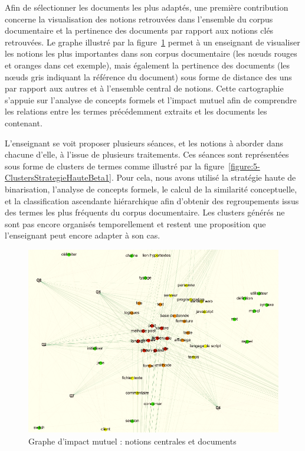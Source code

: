 \bigskip

Afin de sélectionner les documents les plus adaptés, une première contribution concerne la visualisation des notions retrouvées dans l'ensemble du corpus documentaire et la pertinence des documents par rapport aux notions clés retrouvées.
Le graphe illustré par la figure~\ref{figure:5-GrapheCoreZoom} permet à un enseignant de visualiser les notions les plus importantes dans son corpus documentaire (les n\oe{}uds rouges et oranges dans cet exemple), mais également la pertinence des documents (les n\oe{}uds gris indiquant la référence du document) sous forme de distance des uns par rapport aux autres et à l'ensemble central de notions.
Cette cartographie s'appuie sur l'analyse de concepts formels et l'impact mutuel afin de comprendre les relations entre les termes précédemment extraits et les documents les contenant.

\bigskip

L'enseignant se voit proposer plusieurs séances, et les notions à aborder dans chacune d'elle, à l'issue de plusieurs traitements.
Ces séances sont représentées sous forme de clusters de termes comme illustré par la figure~\ref{figure:5-ClustersStrategieHauteBeta1}.
Pour cela, nous avons utilisé la stratégie haute de binarisation, l'analyse de concepts formels, le calcul de la similarité conceptuelle, et la classification ascendante hiérarchique afin d'obtenir des regroupements issus des termes les plus fréquents du corpus documentaire.
Les clusters générés ne sont pas encore organisés temporellement et restent une proposition que l'enseignant peut encore adapter à son cas.

\newpage

\hspace{0pt}
\vfill


\begin{figure}[htb!]
\centering
\centerline{  %
\includegraphics[scale=0.65]{4-Experiences/images/cas-1/graphe-Directe-core-zoom.png}
}
\caption{Graphe d'impact mutuel : notions centrales et documents}
\label{figure:5-GrapheCoreZoom}
\end{figure}



